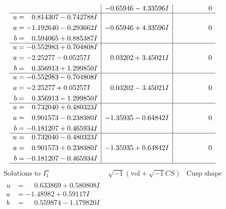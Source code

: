 \documentclass[1p]{elsarticle_modified}
\theoremstyle{definition}
\newcommand{\I}{\sqrt{-1}}
\begin{document}
$$\begin{array}{c|c|c}
 & -0.65946 - 4.33596 I & \phantom{-0.000000 } 0 \\ \hline\begin{aligned}
u &= \phantom{-}0.814307 - 0.742788 I \\
a &= -1.192640 - 0.293662 I \\
b &= \phantom{-}0.594065 + 0.885387 I\end{aligned}
 & -0.65946 + 4.33596 I & \phantom{-0.000000 } 0 \\ \hline\begin{aligned}
u &= -0.552983 + 0.704808 I \\
a &= -2.25277 - 0.05257 I \\
b &= \phantom{-}0.356913 + 1.299850 I\end{aligned}
 & \phantom{-}0.03202 + 3.45021 I & \phantom{-0.000000 } 0 \\ \hline\begin{aligned}
u &= -0.552983 - 0.704808 I \\
a &= -2.25277 + 0.05257 I \\
b &= \phantom{-}0.356913 - 1.299850 I\end{aligned}
 & \phantom{-}0.03202 - 3.45021 I & \phantom{-0.000000 } 0 \\ \hline\begin{aligned}
u &= \phantom{-}0.732040 + 0.480323 I \\
a &= \phantom{-}0.901573 - 0.238380 I \\
b &= -0.181207 + 0.465934 I\end{aligned}
 & -1.35935 - 0.64842 I & \phantom{-0.000000 } 0 \\ \hline\begin{aligned}
u &= \phantom{-}0.732040 - 0.480323 I \\
a &= \phantom{-}0.901573 + 0.238380 I \\
b &= -0.181207 - 0.465934 I\end{aligned}
 & -1.35935 + 0.64842 I & \phantom{-0.000000 } 0\\
 \hline 
 \end{array}$$\newpage$$\begin{array}{c|c|c}  
\text{Solutions to }I^u_{1}& \I (\text{vol} + \sqrt{-1}CS) & \text{Cusp shape}\\
 \hline 
\begin{aligned}
u &= \phantom{-}0.633869 + 0.580808 I \\
a &= -1.48982 + 0.59117 I \\
b &= \phantom{-}0.559874 - 1.179820 I\end{aligned}

\end{array}$$
\end{document}

